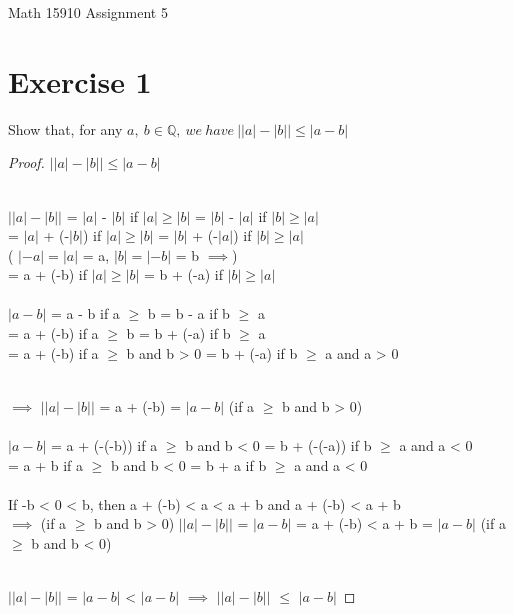 \documentclass[12pt]{article}
\providecommand{\abs}[1]{\lvert #1 \rvert}
\theoremstyle{definition}
\numberwithin{equation}{subsection}
\begin{document}
\pagestyle{plain}



\begin{center}
{\large Math 15910 Assignment 5} \\ 
\vspace{.2in}  
\end{center}



\section{Exercise 1}
Show that, for any $a, \ b \in \mathbb{Q}, \ we \ have \ \abs{\abs{a}-\abs{b}} \leq \abs{a - b}$

\begin{proof}
$\abs{\abs{a}-\abs{b}} \leq \abs{a - b}$

\\ $\abs{\abs{a}-\abs{b}}$ = $\abs{a}$ - $\abs{b}$ if $\abs{a} \geq \abs{b}$ = $\abs{b}$ - $\abs{a}$ if $\abs{b} \geq \abs{a}$ 
\\ = $\abs{a}$ + (-$\abs{b}$) if $\abs{a} \geq \abs{b}$ = $\abs{b}$ + (-$\abs{a}$) if $\abs{b} \geq \abs{a}$ 
\\ ( $\abs{-a} = \abs{a}$ = a, $\abs{b} = \abs{-b}$ = b $\implies$)
\\ = a + (-b) if $\abs{a} \geq \abs{b}$ = b + (-a) if $\abs{b} \geq \abs{a}$ \\ \\

$\abs{a - b}$ = a - b if a $\geq$ b = b - a if b $\geq$ a
\\ = a + (-b) if a $\geq$ b = b + (-a) if b $\geq$ a
\\ = a + (-b) if a $\geq$ b and b > 0 = b + (-a) if b $\geq$ a and a > 0

\\ $\implies$ $\abs{\abs{a}-\abs{b}}$ = a + (-b) = $\abs{a - b}$ (if a $\geq$ b and b > 0) \\ \\

$\abs{a - b}$ = a + (-(-b)) if a $\geq$ b and b < 0 = b + (-(-a)) if b $\geq$ a and a < 0
\\ = a + b if a $\geq$ b and b < 0 = b + a if b $\geq$ a and a < 0 \\ \\

If -b < 0 < b, then a + (-b) < a < a + b and a + (-b) < a + b
\\ $\implies$ (if a $\geq$ b and b > 0) $\abs{\abs{a}-\abs{b}}$ = $\abs{a - b}$ = a + (-b) < a + b  = $\abs{a - b}$ (if a $\geq$ b and b < 0)

\\ $\abs{\abs{a}-\abs{b}}$ = $\abs{a - b}$ < $\abs{a - b}$ $\implies$ $\abs{\abs{a}-\abs{b}}$ $\leq$ $\abs{a - b}$

\end{proof}
\end{document}
